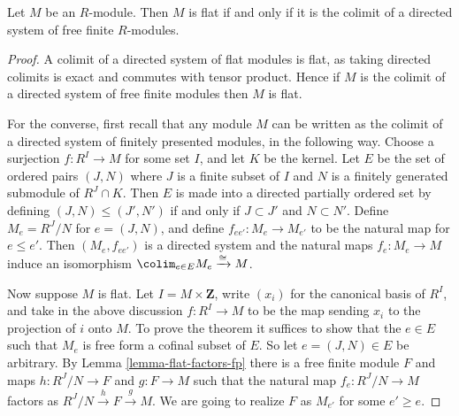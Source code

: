 \begin{theorem}
\label{theorem-lazard}
Let $M$ be an $R$-module.  Then $M$ is flat if and only if it is the colimit of
a directed system of free finite $R$-modules.
\end{theorem}

\begin{proof}
A colimit of a directed system of flat modules is flat, as taking directed
colimits is exact and commutes with tensor product. Hence if $M$ is the colimit
of a directed system of free finite modules then $M$ is flat.

\medskip\noindent
For the converse, first recall that any module $M$ can be written as the
colimit of a directed system of finitely presented modules, in the following
way.  Choose a surjection $f: R^I \to M$ for some set $I$, and let $K$
be the kernel.  Let $E$ be the set of ordered pairs $(J, N)$ where $J$ is a
finite subset of $I$ and $N$ is a finitely generated submodule of $R^J \cap K$.
Then $E$ is made into a directed partially ordered set by defining $(J, N) \leq
(J', N')$ if and only if $J \subset J'$ and $N \subset N'$.  Define $M_e =
R^J/N$ for $e = (J, N)$, and define $f_{ee'}: M_e \to M_{e'}$ to be
the natural map for $e \leq e'$.  Then $(M_e, f_{ee'})$ is a directed system and
the natural maps $f_e: M_e \to M$ induce an isomorphism
$\colim_{e
\in E} M_e \xrightarrow{\cong} M$.

\medskip\noindent
Now suppose $M$ is flat.  Let $I = M \times \mathbf{Z}$, write $(x_i)$ for
the canonical basis of $R^{I}$, and take in the above discussion $f: R^I
\to M$ to be the map sending $x_i$ to the projection of $i$ onto $M$.
To prove the theorem it suffices to show that the $e \in E$ such that $M_e$
is free form a cofinal subset of $E$.  So let $e = (J, N) \in E$ be arbitrary.
By Lemma \ref{lemma-flat-factors-fp} there is a free finite module $F$ and maps
$h: R^J/N \to F$ and $g: F \to M$ such that the natural map
$f_e: R^J/N \to M$ factors as $R^J/N \xrightarrow{h} F
\xrightarrow{g} M$.  We are going to realize $F$ as $M_{e'}$ for some $e' \geq
e$.


\end{proof}
